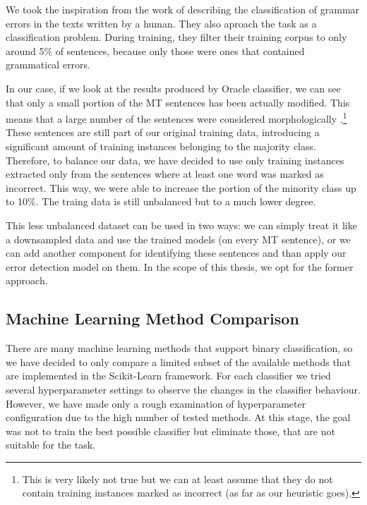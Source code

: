 We took the inspiration from the work of \citet{2013_Jia_CoNLL_GrammaticalError} describing the classification of grammar errors in the texts
written by a human. They also aproach the task as a classification
problem. During training, they filter their training corpus to only around 5\% of
sentences, because only those were ones that contained grammatical errors.

In our case, if we look at the results produced by Oracle classifier, we can see that
only a small portion of the MT sentences has been actually modified. This means that a large number of the sentences
were considered morphologically .\footnote{This is very likely not true but we can at least assume
that they do not contain training instances marked as incorrect (as far as our heuristic goes).}
These sentences are still part of our original training data, introducing a significant amount of training
instances belonging to the majority class.
Therefore, to balance our data, we have decided to use only training
instances extracted only from the sentences where at least one word was marked as incorrect. This way, we were
able to increase the portion of the minority class up to 10\%. The traing data is still unbalanced
but to a much lower degree.

This less unbalanced dataset can be used in two ways: we can simply treat
it like a downsampled data and use the trained models  (on every MT sentence),
or we can add another component for identifying these  sentences
and than apply our error detection model on them. In the scope of this thesis, we opt for the former
approach.



\subsection{Machine Learning Method Comparison}

There are many machine learning methods that support binary classification, so we have
decided to only compare a limited subset of the available methods that are implemented
in the Scikit-Learn framework. For each classifier we tried several hyperparameter
settings to observe the changes in the classifier behaviour. However, we have made only
a rough examination of hyperparameter configuration due to the high number of tested
methods. At this stage, the goal was not to train the best possible classifier but
eliminate those, that are not suitable for the task.

